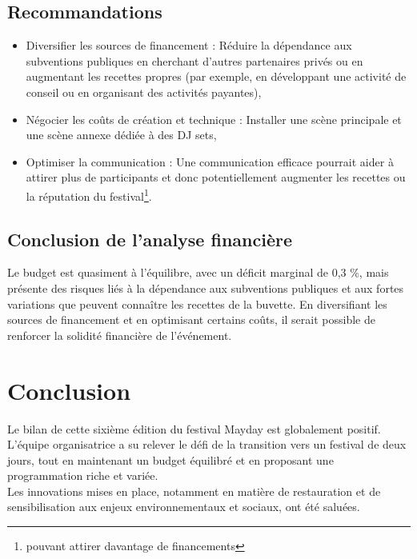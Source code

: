 \documentclass[12pt,a4paper]{report}
\begin{document}
\section{Recommandations}
\begin{itemize}
\item Diversifier les sources de financement : Réduire la dépendance aux subventions publiques en cherchant d'autres partenaires privés ou en augmentant les recettes propres (par exemple, en développant une activité de conseil ou en organisant des activités payantes),
\item Négocier les coûts de création et technique : Installer une scène principale et une scène annexe dédiée à des DJ sets,
\item Optimiser la communication : Une communication efficace pourrait aider à attirer plus de participants et donc potentiellement augmenter les recettes ou la réputation du festival\footnote{pouvant attirer davantage de financements}.
\end{itemize}

\section{Conclusion de l'analyse financière}
Le budget est quasiment à l'équilibre, avec un déficit marginal de 0,3 \%, mais présente des risques liés à la dépendance aux subventions publiques et aux fortes variations que peuvent connaître les recettes de la buvette. En diversifiant les sources de financement et en optimisant certains coûts, il serait possible de renforcer la solidité financière de l'événement.

\chapter*{Conclusion}

Le bilan de cette sixième édition du festival Mayday est globalement positif.\\

L’équipe organisatrice a su relever le défi de la transition vers un festival de deux jours, tout en maintenant un budget équilibré et en proposant une programmation riche et variée.\\

Les innovations mises en place, notamment en matière de restauration et de sensibilisation aux enjeux environnementaux et sociaux, ont été saluées.\\
\end{document}

